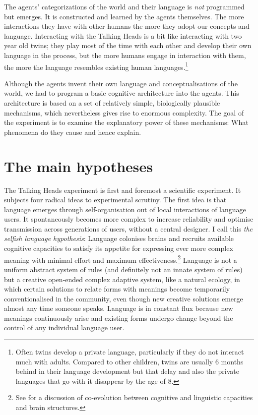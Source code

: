 The agents' categorizations of
the world and their language is {\it not} programmed but
emerges. It is 
constructed and learned by the agents themselves. The more 
interactions they have with other humans the more they 
adopt our concepts and language. Interacting with the Talking 
Heads is a bit like interacting with two year old 
twins; they play  most of the time with each other and
develop their own language in the process, but the more
humans engage in interaction with them, the more the language
resembles existing human languages.\footnote{Often twins develop a private language, particularly 
if they do not interact much with adults. Compared
to other children, twins are usually 6 months behind 
in their language development but that delay and 
also the private languages that go with it disappear
by the age of 8.}

Although the agents invent their own 
language and conceptualisations of the world, we
had to program a basic cognitive architecture into 
the agents. This architecture is based on a set of relatively
simple, biologically plausible mechanisms, which 
nevertheless gives rise to enormous complexity.
The goal of the experiment is to examine the explanatory power of 
these mechanisms: What phenomena do they cause and
hence explain. 

\section{The main hypotheses}

The Talking Heads experiment is first and foremost
a scientific experiment. It subjects four radical ideas 
to experimental scrutiny. 
The first idea is that 
language emerges through self-organisation out of local
interactions of language users. It spontaneously 
becomes more complex to increase
reliability and optimise transmission across generations of 
users, without a central designer.
I call this {\it the selfish
language hypothesis}: Language colonises
brains and recruits available cognitive capacities to satisfy
its appetite for expressing ever more complex meaning with
minimal effort and maximum 
effectiveness.\footnote{
See \cite{Deacon:1998} for a discussion of 
co-evolution between cognitive and linguistic
capacities and brain structures.}
Language is 
not a uniform abstract system of rules (and definitely not an 
innate system of rules) but a creative open-ended complex
adaptive system, like a natural
ecology, in which certain solutions to relate forms with 
meanings become temporarily conventionalised in 
the community, even though new creative solutions
emerge almost any time someone speaks. Language
is in constant flux because new meanings continuously
arise and existing forms undergo change beyond the 
control of any individual language user. 

